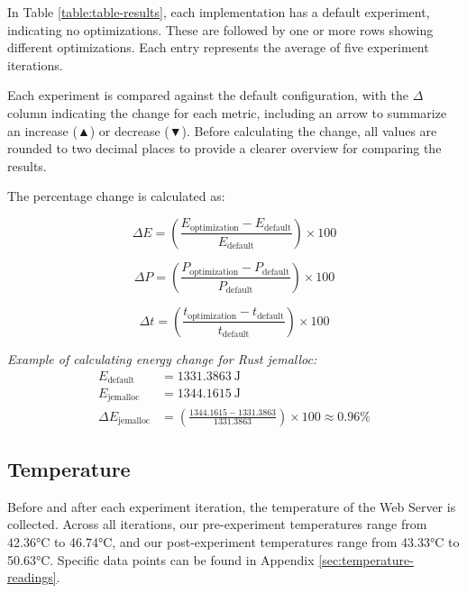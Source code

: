 \documentclass[main.tex]{subfiles}
\begin{document}


In Table \ref{table:table-results}, each implementation has a default experiment, indicating no optimizations. These are followed by one or more rows showing different optimizations. Each entry represents the average of five experiment iterations.

Each experiment is compared against the default configuration, with the  $\Delta$ column indicating the change for each metric, including an arrow to summarize an increase (▲) or decrease (▼). Before calculating the change, all values are rounded to two decimal places to provide a clearer overview for comparing the results.

The percentage change is calculated as:

\[
\Delta E = \left( \frac{E_{\text{optimization}} - E_{\text{default}}}{E_{\text{default}}} \right) \times 100
\]

\[
\Delta P = \left( \frac{P_{\text{optimization}} - P_{\text{default}}}{P_{\text{default}}} \right) \times 100
\]

\[
\Delta t = \left( \frac{t_{\text{optimization}} - t_{\text{default}}}{t_{\text{default}}} \right) \times 100
\]

\textit{Example of calculating energy change for Rust jemalloc:
}
\begin{align*}
E_{\text{default}} &= 1331.3863~\text{J} \\
E_{\text{jemalloc}} &= 1344.1615~\text{J} \\
\text{$\Delta E_{\text{jemalloc}}$} &= \left( \frac{1344.1615 - 1331.3863}{1331.3863} \right) \times 100 \approx 0.96\%
\end{align*}


\subsection{Temperature}
Before and after each experiment iteration, the temperature of the Web Server is collected. Across all iterations, our pre-experiment temperatures range from 42.36°C to 46.74°C, and our post-experiment temperatures range from 43.33°C to 50.63°C. Specific data points can be found in Appendix \ref{sec:temperature-readings}.
\end{document}
